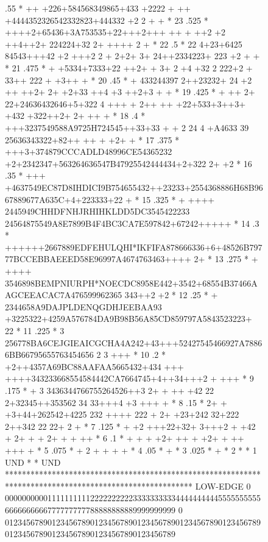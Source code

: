 \begin{figure}[p]
\begin{minipage}[t]{.495\textwidth}
\begin{XMPfrac}{3.3}
     .55   *               ++ +226+584568349865+433 +2222 +      ++ +4444352326542332823+444332 +2 2 + +          *  23
     .525  *                 ++++2+65436+3A753535+22+++2+++  ++ + ++2  +2 ++4++2+ 224224+32 2+ ++++ 2      +      *  22
     .5    *                 22  4+23+6425 84543+++42 +2     +++2  2 + 2+2+ 3+ 24++2334223+ 223  +2   +       +   *  21
     .475  *         +             +5334+7333+22  ++2+ +  3+      2 +4 +32  2 222+2 + 33++ 222 +  +3++     +      *  20
     .45   *                  +  433244397 2++23232+ 24 +2        ++  ++2+ 2+ +2+33  ++4 +3 ++2+3    +  +         *  19
     .425  *           +  ++ 2+ 22+24636432646+5+322 4 +++ + 2++  ++ +22+533+3++3+  +432 +322++2+     2+  ++ +    *  18
     .4    *                +++3237549588A9725H724545++33+33 + + 2 24  4 +A4633 39 25636343322+82++ ++ + +2+  +   *  17
     .375  *              +++3+374879CCCADLD48996CE54365232 +2+2342347+563264636547B47925542444434+2+322 2+  +2   *  16
     .35   *            +++ +4637549EC87D8IHDICI9B754655432++23233+2554368886H68B9667889677A635C+4+223333+22  +   *  15
     .325  *        +  ++++ 2445949CHHDFNHJRHIHKLDD5DC3545422233 24564875549A8E7899B4F4BC3CA7E597842+67242+++++   *  14
     .3    *          ++++++2667889EDFEHULQHI*IKFIFA878666336+6+48526B79777BCCEBBAEEED58E96997A4674763463++++ 2+  *  13
     .275  *        +  ++++ 3546898BEMPNIURPH*NOECDC8958E442+3542+68554B37466AAGCEEACAC7A476599962365 343++2 +2   *  12
     .25   *        +     2344658A9DAJPLDENQGDHJEEBAA93 +3225322+4259A576784DA9B98B56A85CD859797A5843523223+ 22   *  11
     .225  *               3 256778BA6CEJGIEAICGCHA4A242+43+++52427545466927A78866BB66795655763454656  2 3 +++    *  10
     .2    *                +2++4357A69BC88AAFAA5665432+434 +++ ++++343233668554584442CA7664745+4++34+++2 + +++   *   9
     .175  *                 + 3  3436344766755264526++3 2+ + ++ +42  22 2+32345++353562 34 33+++4 +3 +++  +      *   8
     .15   *                  2+ + +3+44+262542+4225 232 ++++   222 + 2+  +23+242 32+222 2++342 22    22+ 2  +    *   7
     .125  *              +   +2  +++22+32+ 3+++2                    +  +42 +  2+ +   +  2+       + + ++          *   6
     .1    *                           +  +   + +2+     ++             +    +2+    +        ++    +++ +           *   5
     .075  *                       + 2  +     +                          +                               +        *   4
     .05   *                                      +                                                               *   3
     .025  *                                                                         +                            *   2
           *                                                                                                      *   1
  UND      *                                                                                                      * UND
           ********************************************************************************************************
LOW-EDGE   0 0000000000111111111122222222223333333333444444444455555555556666666666777777777788888888889999999999
           0 0123456789012345678901234567890123456789012345678901234567890123456789012345678901234567890123456789
 

\end{XMPfrac}
\end{minipage}
\end{figure}
